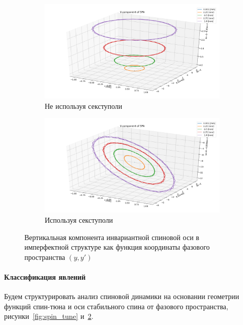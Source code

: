 \documentclass{article}     %
\begin{document}
\begin{figure}[h]
  \centering
  \begin{subfigure}{\linewidth}
    \centering
    \includegraphics[width=\linewidth]{../img/IPAC19/NY_VS_YB_IMPERFECT_UNOPT}
    \caption{Не используя секступоли}
  \end{subfigure}
  \begin{subfigure}{\linewidth}
    \centering
    \includegraphics[width=\linewidth]{../img/IPAC19/NY_VS_YB_IMPERFECT_OPTIM}
    \caption{Используя секступоли\label{fig:spa_optim}}
  \end{subfigure}
  \caption{Вертикальная компонента инвариантной спиновой оси
    в имперфектной структуре как функция координаты фазового пространства $(y, y')$\label{fig:spa}}
\end{figure}

\paragraph{Классификация явлений}
Будем структурировать анализ спиновой динамики на основании геометрии функций спин-тюна и оси стабильного спина
от фазового пространства, рисунки~\ref{fig:spin_tune} и~\ref{fig:spa}.
\end{document}
